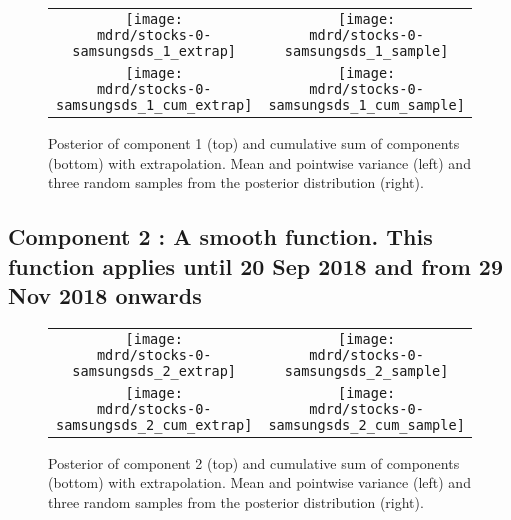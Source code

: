 \documentclass{article} %
\begin{document}


\begin{figure}[H]
\newcommand{\wmgd}{0.5\columnwidth}
\newcommand{\hmgd}{3.0cm}
\newcommand{\mdrd}{stocks-0-samsungsds}
\newcommand{\mbm}{\hspace{-0.3cm}}
\begin{tabular}{cc}
\mbm \texttt{[image: \\mdrd/stocks-0-samsungsds\_1\_extrap]} & \texttt{[image: \\mdrd/stocks-0-samsungsds\_1\_sample]} \\
\mbm \texttt{[image: \\mdrd/stocks-0-samsungsds\_1\_cum\_extrap]} & \texttt{[image: \\mdrd/stocks-0-samsungsds\_1\_cum\_sample]}
\end{tabular}
\caption{Posterior of component 1 (top) and cumulative sum of components (bottom) with extrapolation. Mean and pointwise variance (left) and three random samples from the posterior distribution (right).}
\label{fig:extrap1}
\end{figure}

\subsection{Component 2 : A smooth function. This function applies until 20 Sep 2018 and from 29 Nov 2018 onwards}



\begin{figure}[H]
\newcommand{\wmgd}{0.5\columnwidth}
\newcommand{\hmgd}{3.0cm}
\newcommand{\mdrd}{stocks-0-samsungsds}
\newcommand{\mbm}{\hspace{-0.3cm}}
\begin{tabular}{cc}
\mbm \texttt{[image: \\mdrd/stocks-0-samsungsds\_2\_extrap]} & \texttt{[image: \\mdrd/stocks-0-samsungsds\_2\_sample]} \\
\mbm \texttt{[image: \\mdrd/stocks-0-samsungsds\_2\_cum\_extrap]} & \texttt{[image: \\mdrd/stocks-0-samsungsds\_2\_cum\_sample]}
\end{tabular}
\caption{Posterior of component 2 (top) and cumulative sum of components (bottom) with extrapolation. Mean and pointwise variance (left) and three random samples from the posterior distribution (right).}
\label{fig:extrap2}
\end{figure}
\end{document}
